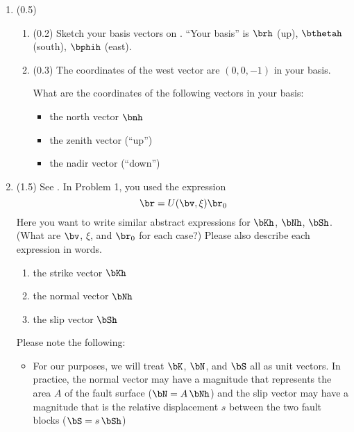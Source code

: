 \documentclass[11pt,titlepage,fleqn]{article}
\newcommand{\rotangB}{\xi}    %
\newcommand{\rotvec}{\bv}      %
\newcommand{\Umat}{U}
\begin{document}
\begin{enumerate}


\item (0.5)
\begin{enumerate}
\item (0.2) Sketch your basis vectors on . ``Your basis'' is $\brh$ (up), $\bthetah$ (south), $\bphih$ (east).

\item (0.3) The coordinates of the west vector are $(0,0,-1)$ in your basis.

What are the coordinates of the following vectors in your basis:

\begin{itemize}
\item the north vector $\bnh$

\item the zenith vector (``up'')

\item the nadir vector (``down'')
\end{itemize}
\end{enumerate}


\item (1.5) See . In Problem 1, you used the expression
%
\begin{equation}
\br = \Umat(\rotvec,\rotangB)\br_0
\end{equation}
%
Here you want to write similar abstract expressions for $\bKh$, $\bNh$, $\bSh$.
(What are $\rotvec$, $\rotangB$, and $\br_0$ for each case?)
Please also describe each expression in words.
%
\begin{enumerate}
\item the strike vector $\bKh$
\item the normal vector $\bNh$
\item the slip vector $\bSh$
\end{enumerate}
%
Please note the following:
%
\begin{itemize}
\item For our purposes, we will treat $\bK$, $\bN$, and $\bS$ all as unit vectors. In practice, the normal vector may have a magnitude that represents the area $A$ of the fault surface ($\bN = A\,\bNh$) and the slip vector may have a magnitude that is the relative displacement $s$ between the two fault blocks ($\bS = s\,\bSh$)


\end{itemize}
\end{enumerate}
\end{document}
